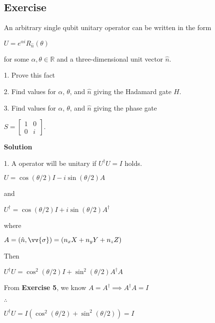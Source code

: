 \documentclass{article}
\begin{document}
\subsection{Exercise}
An arbitrary single qubit unitary operator can be written in the form
\begin{center}
  $U = e^{\alpha i}R_{\hat{n}}(\theta)$
\end{center}
for some $\alpha, \theta \in \mathbb{R}$ and a three-dimensional unit vector $\hat{n}$.

1. Prove this fact

2. Find values for $\alpha$, $\theta$, and $\hat{n}$ giving the Hadamard gate $H$.

3. Find values for $\alpha$, $\theta$, and $\hat{n}$ giving the phase gate

\begin{center}
  $S = 
    \begin{bmatrix}
      1 & 0 \\
      0 & i
    \end{bmatrix}$.
\end{center}

\textbf{Solution}

1. A operator will be unitary if $U^{\dagger}U = I$ holds.

\begin{center}
  $U = \cos{(\theta/2)}I - i\sin{(\theta/2)}A$
\end{center}

and

\begin{center}
  $U^{\dagger} = \cos{(\theta/2)}I + i\sin{(\theta/2)}A^{\dagger}$
\end{center}

where

\begin{center}
  $A = (\hat{n},\vv{\sigma}) = (n_{x}X+n_{y}Y+n_{z}Z)$
\end{center}

Then

\begin{center}
  $U^{\dagger}U = \cos^{2}{(\theta/2)}I + \sin^{2}{(\theta/2)}A^{\dagger}A$
\end{center}

From \textbf{Exercise 5}, we know $A = A^{\dagger} \implies A^{\dagger}A = I$ 

$\therefore$

\begin{center}
  $U^{\dagger}U = I(\cos^{2}{(\theta/2)} + \sin^{2}{(\theta/2)}) = I$
\end{center}
\end{document}

